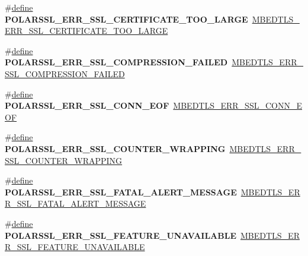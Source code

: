 \begin{DoxyCompactItemize}
\mbox{\label{compat-1_83_8h_ad5db026d994cb67ac466c9181f380be0}} 
\#\hyperlink{structdefine}{define} {\bfseries P\+O\+L\+A\+R\+S\+S\+L\+\_\+\+E\+R\+R\+\_\+\+S\+S\+L\+\_\+\+C\+E\+R\+T\+I\+F\+I\+C\+A\+T\+E\+\_\+\+T\+O\+O\+\_\+\+L\+A\+R\+GE}~\hyperlink{ssl_8h_a654b5a02c3e99f08306fdaceef5a4969}{M\+B\+E\+D\+T\+L\+S\+\_\+\+E\+R\+R\+\_\+\+S\+S\+L\+\_\+\+C\+E\+R\+T\+I\+F\+I\+C\+A\+T\+E\+\_\+\+T\+O\+O\+\_\+\+L\+A\+R\+GE}
\item 
\mbox{\label{compat-1_83_8h_a90a14481136649c0a89a7ca5fa4eb750}} 
\#\hyperlink{structdefine}{define} {\bfseries P\+O\+L\+A\+R\+S\+S\+L\+\_\+\+E\+R\+R\+\_\+\+S\+S\+L\+\_\+\+C\+O\+M\+P\+R\+E\+S\+S\+I\+O\+N\+\_\+\+F\+A\+I\+L\+ED}~\hyperlink{ssl_8h_a241d50351ffe9edeef80469a99592510}{M\+B\+E\+D\+T\+L\+S\+\_\+\+E\+R\+R\+\_\+\+S\+S\+L\+\_\+\+C\+O\+M\+P\+R\+E\+S\+S\+I\+O\+N\+\_\+\+F\+A\+I\+L\+ED}
\item 
\mbox{\label{compat-1_83_8h_a28bfc80f65337b0dbd4b006e53274b32}} 
\#\hyperlink{structdefine}{define} {\bfseries P\+O\+L\+A\+R\+S\+S\+L\+\_\+\+E\+R\+R\+\_\+\+S\+S\+L\+\_\+\+C\+O\+N\+N\+\_\+\+E\+OF}~\hyperlink{ssl_8h_ab82e0253b53fa62fab94b98ef9eb97f9}{M\+B\+E\+D\+T\+L\+S\+\_\+\+E\+R\+R\+\_\+\+S\+S\+L\+\_\+\+C\+O\+N\+N\+\_\+\+E\+OF}
\item 
\mbox{\label{compat-1_83_8h_a3802ace7255386bfbe71925823fc9931}} 
\#\hyperlink{structdefine}{define} {\bfseries P\+O\+L\+A\+R\+S\+S\+L\+\_\+\+E\+R\+R\+\_\+\+S\+S\+L\+\_\+\+C\+O\+U\+N\+T\+E\+R\+\_\+\+W\+R\+A\+P\+P\+I\+NG}~\hyperlink{ssl_8h_ae8cfe8ffb3e7448e6097a7601b349ac5}{M\+B\+E\+D\+T\+L\+S\+\_\+\+E\+R\+R\+\_\+\+S\+S\+L\+\_\+\+C\+O\+U\+N\+T\+E\+R\+\_\+\+W\+R\+A\+P\+P\+I\+NG}
\item 
\mbox{\label{compat-1_83_8h_a5cb8a175a1f0c3b3fe77f26fd32abda2}} 
\#\hyperlink{structdefine}{define} {\bfseries P\+O\+L\+A\+R\+S\+S\+L\+\_\+\+E\+R\+R\+\_\+\+S\+S\+L\+\_\+\+F\+A\+T\+A\+L\+\_\+\+A\+L\+E\+R\+T\+\_\+\+M\+E\+S\+S\+A\+GE}~\hyperlink{ssl_8h_acc37a34787c5c5484a993ff64c3a1634}{M\+B\+E\+D\+T\+L\+S\+\_\+\+E\+R\+R\+\_\+\+S\+S\+L\+\_\+\+F\+A\+T\+A\+L\+\_\+\+A\+L\+E\+R\+T\+\_\+\+M\+E\+S\+S\+A\+GE}
\item 
\mbox{\label{compat-1_83_8h_a39e027ae9b490271b7c7b0e7bd4ec9a6}} 
\#\hyperlink{structdefine}{define} {\bfseries P\+O\+L\+A\+R\+S\+S\+L\+\_\+\+E\+R\+R\+\_\+\+S\+S\+L\+\_\+\+F\+E\+A\+T\+U\+R\+E\+\_\+\+U\+N\+A\+V\+A\+I\+L\+A\+B\+LE}~\hyperlink{ssl_8h_aea8b7e95c7e547959c10e9cad5f46043}{M\+B\+E\+D\+T\+L\+S\+\_\+\+E\+R\+R\+\_\+\+S\+S\+L\+\_\+\+F\+E\+A\+T\+U\+R\+E\+\_\+\+U\+N\+A\+V\+A\+I\+L\+A\+B\+LE}

\end{DoxyCompactItemize}
